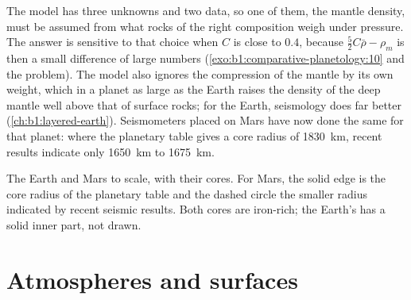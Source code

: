 The model has three unknowns and two data, so one of them, the mantle
density, must be assumed from what rocks of the right composition weigh
under pressure. The answer is sensitive to that choice when $C$ is close to
$0.4$, because $\tfrac52C\bar\rho - \rho_m$ is then a small difference of
large numbers (\cref{exo:b1:comparative-planetology:10} and the problem). The
model also ignores the compression of the mantle by its own weight, which
in a planet as large as the Earth raises the density of the deep mantle well
above that of surface rocks; for the Earth, seismology does far better
(\cref{ch:b1:layered-earth}). Seismometers placed on Mars have now done the
same for that planet: where the planetary table gives a core radius of
\qty{1830}{km}, recent results indicate only \qty{1650}{km} to
\qty{1675}{km}.

\begin{omfigure}

{\small The Earth and Mars to scale, with their cores. For Mars, the solid
edge is the core radius of the planetary table and the dashed circle the
smaller radius indicated by recent seismic results. Both cores are iron-rich;
the Earth's has a solid inner part, not drawn.}
\end{omfigure}

\section{Atmospheres and surfaces}

